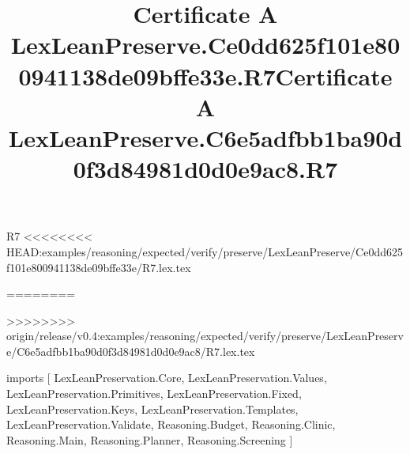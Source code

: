 \begin{lexlean}{R7}
<<<<<<<< HEAD:examples/reasoning/expected/verify/preserve/LexLeanPreserve/Ce0dd625f101e800941138de09bffe33e/R7.lex.tex
\title{Certificate A LexLeanPreserve.Ce0dd625f101e800941138de09bffe33e.R7}
========
\title{Certificate A LexLeanPreserve.C6e5adfbb1ba90d0f3d84981d0d0e9ac8.R7}
>>>>>>>> origin/release/v0.4:examples/reasoning/expected/verify/preserve/LexLeanPreserve/C6e5adfbb1ba90d0f3d84981d0d0e9ac8/R7.lex.tex
\begin{coremodule}
imports [
  LexLeanPreservation.Core,
  LexLeanPreservation.Values,
  LexLeanPreservation.Primitives,
  LexLeanPreservation.Fixed,
  LexLeanPreservation.Keys,
  LexLeanPreservation.Templates,
  LexLeanPreservation.Validate,
  Reasoning.Budget,
  Reasoning.Clinic,
  Reasoning.Main,
  Reasoning.Planner,
  Reasoning.Screening
]


\end{coremodule}
\end{lexlean}
